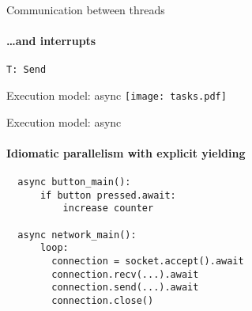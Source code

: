 \documentclass[aspectratio=169]{beamer}
\begin{document}
\begin{frame}{Communication between threads}
\framesubtitle{\ldots and interrupts}\Huge
  \texttt{T: Send}
\end{frame}

\begin{frame}{Execution model: async}\Large
  \center
  \vspace{-1em}
  \texttt{[image: tasks.pdf]}
\end{frame}

\begin{frame}[fragile]{Execution model: async}
\framesubtitle{Idiomatic parallelism with explicit yielding}
  \begin{verbatim}
  async button_main():
      if button pressed.await:
          increase counter

  async network_main():
      loop:
        connection = socket.accept().await
        connection.recv(...).await
        connection.send(...).await
        connection.close()
  \end{verbatim}
\end{frame}
\end{document}
